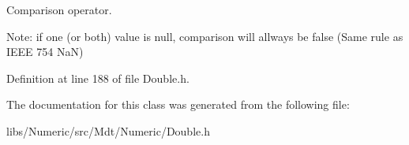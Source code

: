 Comparison operator. 

Note\+: if one (or both) value is null, comparison will allways be false (Same rule as I\+E\+EE 754 NaN) 

Definition at line 188 of file Double.\+h.



The documentation for this class was generated from the following file\+:\begin{DoxyCompactItemize}
\item 
libs/\+Numeric/src/\+Mdt/\+Numeric/Double.\+h\end{DoxyCompactItemize}
